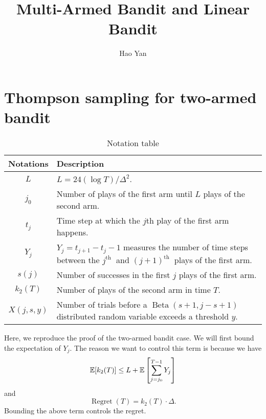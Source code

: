\documentclass[letterpaper,11pt]{article}
\title{Multi-Armed Bandit and Linear Bandit}
\author{Hao Yan}
\date{}
\begin{document}

\maketitle

\section{Thompson sampling for two-armed bandit}


\begin{table}[h]
    \centering
    \renewcommand{\arraystretch}{1.2} %
    \begin{tabular}{c p{12cm}}
        \hline
        \textbf{Notations} & \textbf{Description} \\ 
        \hline
        $L$ & $L=24(\log T) / \Delta^2$.\\
        $j_0$ & Number of plays of the first arm until $L$ plays of the second arm.\\ 
        $t_j$ & Time step at which the $j$th play of the first arm happens. \\ 
        $Y_j$ & $Y_j = t_{j+1} - t_j - 1$ measures the number of time steps between the $j^{\text {th }}$ and $(j+1)^{\text {th }}$ plays of the first arm. \\ 
        $s(j)$ & Number of successes in the first $j$ plays of the first arm. \\ 
        $k_2(T)$ & Number of plays of the second arm in time $T$. \\
        $X(j, s, y)$ & Number of trials before a $\operatorname{Beta}(s+1, j-s+1)$ distributed random variable exceeds a threshold $y$.
        \\ \hline
    \end{tabular}
    \caption{Notation table}
    \label{tab:notation}
\end{table}


Here, we reproduce the proof of the two-armed bandit case. 
We will first bound the expectation of $Y_j$. 
The reason we want to control this term is because we have
\begin{equation*}
    \mathbb{E} [k_2(T)] \leq L + \mathbb{E} \left[\sum_{j=j_0}^{T-1} Y_j\right]
\end{equation*}
and 
\begin{equation*}
    \operatorname{Regret}(T) = k_2(T) \cdot \Delta. 
\end{equation*}
Bounding the above term controls the regret. 
\end{document}
